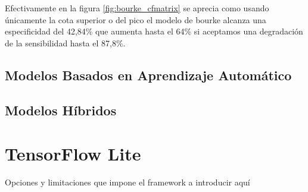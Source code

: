 \documentclass[../tfm.tex]{subfiles}
\begin{document}
Efectivamente en la figura \ref{fig:bourke_cfmatrix} se aprecia como usando únicamente la cota superior o del pico el modelo de bourke alcanza una especificidad del 42,84\% que aumenta hasta el 64\% si aceptamos una degradación de la sensibilidad hasta el 87,8\%.

\subsection{Modelos Basados en Aprendizaje Automático}

\subsection{Modelos Híbridos}

\section{TensorFlow Lite} \label{req_tflite}
Opciones y limitaciones que impone el framework a introducir aquí
\end{document}
